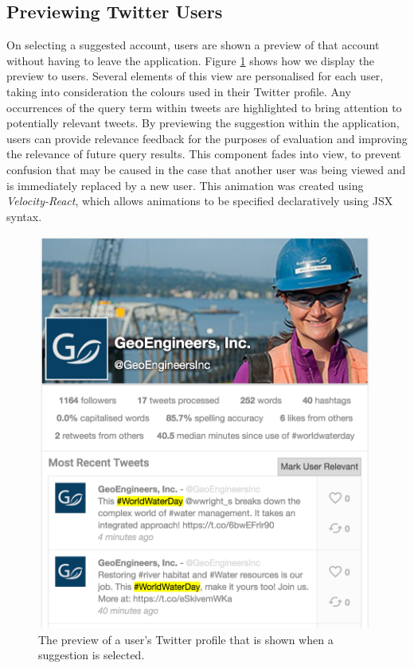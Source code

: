 \documentclass{l4proj}
\begin{document}
        \subsection{Previewing Twitter Users}
        On selecting a suggested account, users are shown a preview of that account without having to leave the application. Figure \ref{userpreview} shows how we display the preview to users. Several elements of this view are personalised for each user, taking into consideration the colours used in their Twitter profile. Any occurrences of the query term within tweets are highlighted to bring attention to potentially relevant tweets. By previewing the suggestion within the application, users can provide relevance feedback for the purposes of evaluation and improving the relevance of future query results. This component fades into view, to prevent confusion that may be caused in the case that another user was being viewed and is immediately replaced by a new user. This animation was created using \textit{Velocity-React}, which allows animations to be specified declaratively \cite{velocityreact} using JSX syntax.
        
\begin{figure}
\centering
\includegraphics[scale=0.5]{userpreview.png}
\caption{The preview of a user's Twitter profile that is shown when a suggestion is selected.}
\label{userpreview}
\end{figure}         
        
\end{document}
